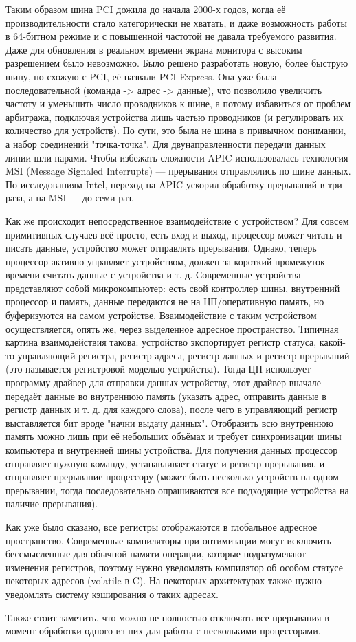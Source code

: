 \documentclass[main.tex]{subfiles}
\begin{document}
Таким образом шина PCI дожила до начала 2000-х годов, когда её производительности
стало категорически не хватать, и даже возможность работы в 64-битном режиме и с повышенной частотой
не давала требуемого развития. Даже для обновления в реальном времени экрана
монитора с высоким разрешением было невозможно. Было решено  разработать новую,
более быструю шину, но схожую с PCI, её назвали PCI Express.
Она уже была последовательной (команда -> адрес -> данные), что позволило
увеличить частоту и уменьшить число проводников к шине, а потому избавиться
от проблем арбитража, подключая устройства лишь частью проводников (и
регулировать их количество для устройств). По сути, это была не шина в привычном понимании, 
а набор соединений "точка-точка". Для двунаправленности передачи данных линии шли парами.
Чтобы избежать сложности APIC использовалась технология
MSI (Message Signaled Interrupts) --- прерывания отправлялись по шине данных. По исследованиям Intel,
переход на APIC ускорил обработку прерываний в три раза, а на MSI ---
до семи раз.

Как же происходит непосредственное взаимодействие с устройством?
Для совсем примитивных случаев всё просто, есть вход и выход, процессор может
читать и писать данные, устройство может отправлять прерывания.
Однако, теперь процессор активно управляет устройством, должен за короткий
промежуток времени считать данные с устройства и т. д.
Современные устройства представляют собой микрокомпьютер: есть свой
контроллер шины, внутренний процессор и память, данные передаются
не на ЦП/оперативную память, но буферизуются на самом устройстве.
Взаимодействие с таким устройством осуществляется, опять же, через
выделенное адресное пространство. Типичная картина взаимодействия такова:
устройство экспортирует регистр статуса, какой-то управляющий регистра,
регистр адреса, регистр данных и регистр прерываний (это называется регистровой моделью устройства).
Тогда ЦП использует программу-драйвер для отправки данных устройству,
этот драйвер вначале передаёт данные во внутреннюю память
(указать адрес, отправить данные в регистр данных и т. д. для каждого слова),
после чего в управляющий регистр выставляется бит вроде "начни выдачу данных".
Отобразить всю внутреннюю память можно лишь при её небольших объёмах
и требует синхронизации шины компьютера и внутренней шины устройства.
Для получения данных процессор отправляет нужную команду, устанавливает
статус и регистр прерывания, и отправляет прерывание процессору
(может быть несколько устройств на одном прерывании, тогда последовательно
опрашиваются все подходящие устройства на наличие прерывания).

Как уже было сказано, все регистры отображаются в глобальное адресное пространство.
Современные компиляторы при оптимизации могут исключить бессмысленные для
обычной памяти операции, которые подразумевают изменения регистров, поэтому
нужно уведомлять компилятор об особом статусе некоторых адресов (volatile в C).
На некоторых архитектурах также нужно уведомлять систему кэширования о таких
адресах.

Также стоит заметить, что можно не полностью отключать все прерывания в момент
обработки одного из них для работы с несколькими процессорами.
\end{document}
